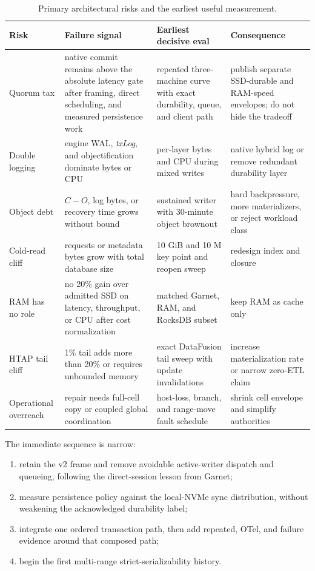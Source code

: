 \documentclass[sigconf,nonacm]{acmart}
\newcommand{\txlog}{\textit{txLog}}
\newcommand{\cversion}{C}
\newcommand{\oversion}{O}
\begin{document}
\begin{table}[t]
  \centering
  \small
  \caption{Primary architectural risks and the earliest useful measurement.}
  \label{tab:risks}
  \begin{tabularx}{\textwidth}{@{}p{}X X X@{}}
    \toprule
    Risk & Failure signal & Earliest decisive eval & Consequence \\
    \midrule
    Quorum tax & native commit remains above the absolute latency gate after
    framing, direct scheduling, and measured persistence work & repeated
    three-machine curve with exact durability, queue, and client path & publish
    separate SSD-durable and RAM-speed envelopes; do not hide the tradeoff \\
    Double logging & engine WAL, \txlog{}, and objectification dominate bytes or
    CPU & per-layer bytes and CPU during mixed writes & native hybrid log or
    remove redundant durability layer \\
    Object debt & $\cversion-\oversion$, log bytes, or recovery time grows without
    bound & sustained writer with 30-minute object brownout & hard backpressure,
    more materializers, or reject workload class \\
    Cold-read cliff & requests or metadata bytes grow with total database size &
    10 GiB and 10 M key point and reopen sweep & redesign index and closure \\
    RAM has no role & no 20\% gain over admitted SSD on latency, throughput, or
    CPU after cost normalization & matched Garnet, RAM, and RocksDB subset & keep
    RAM as cache only \\
    HTAP tail cliff & 1\% tail adds more than 20\% or requires unbounded memory &
    exact DataFusion tail sweep with update invalidations & increase
    materialization rate or narrow zero-ETL claim \\
    Operational overreach & repair needs full-cell copy or coupled global
    coordination & host-loss, branch, and range-move fault schedule & shrink cell
    envelope and simplify authorities \\
    \bottomrule
  \end{tabularx}
\end{table}

The immediate sequence is narrow:

\begin{enumerate}
  \item retain the v2 frame and remove avoidable active-writer dispatch and
  queueing, following the direct-session lesson from Garnet;
  \item measure persistence policy against the local-NVMe sync distribution,
  without weakening the acknowledged durability label;
  \item integrate one ordered transaction path, then add repeated, OTel, and
  failure evidence around that composed path;
  \item begin the first multi-range strict-serializability history.
\end{enumerate}
\end{document}

